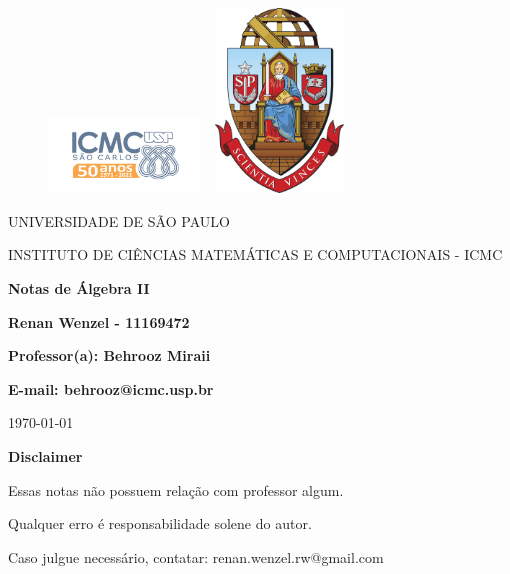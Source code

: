 \documentclass{article}
\begin{document}
\begin{figure}[ht]
	\includegraphics[width=4cm]{icmc.png}
	\hspace{7cm}
	\includegraphics[height=4.9cm,width=4cm]{brasao_usp_cor.jpg}
	\endminipage
\end{figure}

\begin{center}
	\vspace{1cm}
	\LARGE
	UNIVERSIDADE DE S\~AO PAULO

	\vspace{1.3cm}
	\LARGE
	INSTITUTO DE CI\^ENCIAS MATEM\'ATICAS E COMPUTACIONAIS - ICMC

	\vspace{1.7cm}
	\Large
	\textbf{Notas de Álgebra II}

	\vspace{1.3cm}
	\large
	\textbf{Renan Wenzel - 11169472}

	\vspace{1.3cm}
	\large
	\textbf{Professor(a): Behrooz Miraii}

	\textbf{E-mail: behrooz@icmc.usp.br}

	\vspace{1.3cm}
	\today
\end{center}

\newpage
\textbf{{\Huge Disclaimer}}
\vspace{5cm}

{\huge Essas notas não possuem relação com professor algum.

	Qualquer erro é responsabilidade solene do autor.

	Caso julgue necessário, contatar: renan.wenzel.rw@gmail.com}
\tableofcontents

\newpage


\newpage

\newpage

\newpage

\newpage

\newpage

\newpage

\newpage

\newpage

\newpage

\newpage

\newpage

\newpage

\newpage

\newpage

\newpage

\newpage

\newpage

\newpage

\newpage

\newpage

\newpage
\end{document}
